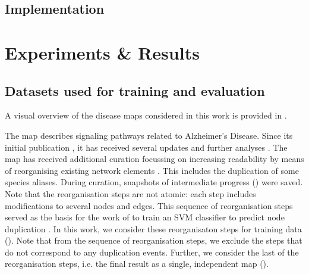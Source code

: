 \documentclass[
	fontsize=10pt, %
	twoside=false, %
	secnumdepth=1, %
  toc=indentunnumbered %
]{kaobook}
\begin{document}
\section{Implementation}





% 



\chapter{Experiments \& Results}
\label{sec:experiments-results}


\section{Datasets used for training and evaluation}
\label{sec:datasets-used}

A visual overview of the disease maps considered in this work is provided in
.

The  map describes signaling pathways related to Alzheimer's
Disease. Since its initial publication
\cite{mizuno_AlzPathwayComprehensiveMap_2012}, it has received several updates
and further analyses \cite{ogishima_MapAlzheimerDiseasesignaling_2013,
  ogishima_AlzPathwayUpdatedMap_2016, mizuno_NetworkAnalysisComprehensive_2016}.
%
The map has received additional curation focussing on increasing readability by
means of reorganising existing network elements
\cite{ostaszewski_AlzPathwayRegorganisationSteps_2021}.
This includes the duplication
of some species aliases. During curation, snapshots of intermediate progress
() were saved. Note that the reorganisation steps are
not atomic: each step includes modifications to several nodes and edges.
This sequence of reorganisation steps served as the basis for the
work of \citeauthor{nielsen_MachineLearningSupport_2019} to train an SVM
classifier to predict node duplication
\cite{nielsen_MachineLearningSupport_2019}. In this work, we consider these
reorganisaton steps for training data ().
Note that from the sequence of reorganisation steps, we exclude the steps that
do not correspond to any duplication events.
Further, we consider
the last of the reorganisation steps, i.e. the final result as a single,
independent map ().
\end{document}
